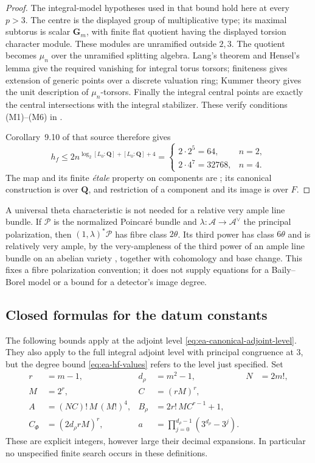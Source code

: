 \documentclass[11pt]{article}
\theoremstyle{definition}
\theoremstyle{remark}
\begin{document}
\begin{proof}
The integral-model hypotheses used in that bound hold here at every
$p>3$.  The centre is the displayed group of multiplicative type;
its maximal subtorus is scalar $\mathbf G_m$, with finite flat quotient
having the displayed torsion character module.  These modules are
unramified outside $2,3$.  The quotient becomes $\mu_n$ over the
unramified splitting algebra.  Lang's theorem and Hensel's lemma give
the required vanishing for integral torus torsors; finiteness gives
extension of generic points over a discrete valuation ring; Kummer
theory gives the unit description of $\mu_n$-torsors.  Finally the
integral central points are exactly the central intersections with the
integral stabilizer.  These verify conditions (M1)--(M6) in \cite[\S9.3]{Jaswal}.

Corollary~9.10 of that source therefore gives
\[
 h_f\le
 2n^{\log_2 [L_0:\mathbf Q]+[L_0:\mathbf Q]+4}
 =\begin{cases}2\cdot2^5=64,&n=2,\\
                 2\cdot4^7=32768,&n=4.
   \end{cases}
\]
The map and its finite \emph{\'etale} property on components are
\cite[Proposition~9.4]{Jaswal}; its canonical construction is over
$\mathbf Q$, and restriction of a component and its image is over $F$.
\end{proof}

A universal theta characteristic is not needed for a relative very
ample line bundle.  If $\mathcal P$ is the normalized Poincar\'e bundle
and $\lambda:\mathcal A\to\mathcal A^\vee$ the principal polarization,
then $(1,\lambda)^*\mathcal P$ has fibre class $2\theta$.
Its third power has class $6\theta$ and is relatively very ample, by the
very-ampleness of the third power of an ample line bundle on an abelian
variety \cite[Remark~7.3, p.~12]{MilneAV}, together with cohomology
and base change.
This fixes a fibre polarization convention; it does not supply equations
for a Baily--Borel model or a bound for a detector's image degree.

\subsection{Closed formulas for the datum constants}

The following bounds apply at the adjoint level
\eqref{eq:ea-canonical-adjoint-level}.  They also apply to the full
integral adjoint level with principal congruence at $3$, but the degree
bound \eqref{eq:ea-hf-values} refers to the level just specified.
Set
\begin{equation}\label{eq:ea-integer-parameters}
 \begin{aligned}
 r&=m-1,& d_\rho&=m^2-1,& N&=2m!,\\
 M&=2^r,& C&=(rM)^r,\\
 A&=(NC)!\,M\,(M!)^4,&
 B_\rho&=2r!\,M C^{r-1}+1,\\
 C_\Phi&=(2d_\rho rM)^r,&
 a&=\prod_{j=0}^{d_\rho-1}(3^{d_\rho}-3^j).
 \end{aligned}
\end{equation}
These are explicit integers, however large their decimal expansions.
In particular no unspecified finite search occurs in these definitions.
\end{document}
